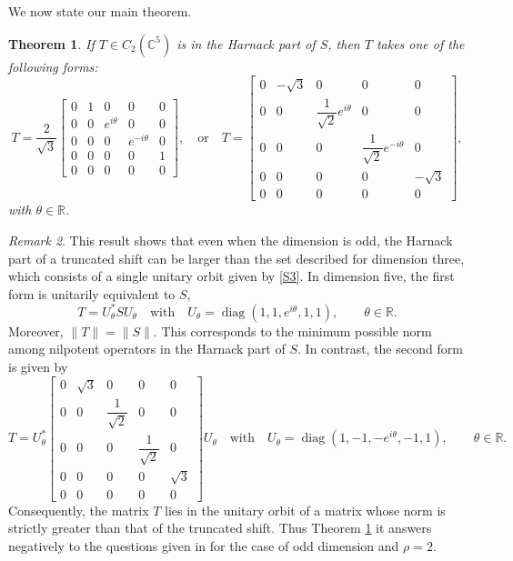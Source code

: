 \documentclass[12pt, reqno]{amsart}
\newtheorem{theorem}{Theorem}[section]
\theoremstyle{definition}
\theoremstyle{remark}
\newtheorem{remark}[theorem]{Remark}
\numberwithin{equation}{section}
\begin{document}
We now state our main theorem.

\begin{theorem}\label{Harnack_part_S5} 
	If $T\in C_2(\mathbb{C}^5)$ is in the Harnack part of $S$, then $T$ takes one of the following forms:
	\begin{equation*}
		T=\dfrac{2}{\sqrt{3}} \begin{bmatrix}
			0 & 1 & 0 & 0 & 0 \\
			0 & 0 & e^{i\theta} & 0 & 0 \\
			0 & 0 & 0 & e^{-i\theta} & 0 \\
			0 & 0 & 0 & 0 & 1 \\
			0 & 0 & 0 & 0 & 0
		\end{bmatrix},\quad \text{or} \quad 
		T=  \begin{bmatrix}
			0 & -\sqrt{3} & 0 & 0 & 0 \\
			0 & 0 & \dfrac{1}{\sqrt{2}}e^{i\theta} & 0 & 0 \\
			0 & 0 & 0 & \dfrac{1}{\sqrt{2}}e^{-i\theta} & 0 \\
			0 & 0 & 0 & 0 & -\sqrt{3} \\
			0 & 0 & 0 & 0 & 0
		\end{bmatrix},
	\end{equation*} 
	with $\theta \in \mathbb{R}$.	
\end{theorem}


\begin{remark}This result shows that even when the dimension is odd, the Harnack part of a truncated shift can be larger than the set described for dimension three, which consists of a single unitary orbit given by \eqref{S3}. In dimension five, the first form is unitarily equivalent to $S$,
	\begin{equation*}\label{S5}
		T = U_{\theta}^{*} S U_\theta \quad \text{with} \quad U_\theta = \operatorname{diag}\left(1, 1, e^{i\theta}, 1, 1 \right), \qquad \theta \in \mathbb{R}.
	\end{equation*}
	Moreover, $\|T\| = \|S\|$. This corresponds to the minimum possible norm among nilpotent operators in the Harnack part of $S$. In contrast, the second form is given by
	\begin{equation*}\label{S5c2}
		T = U_{\theta}^{*} \begin{bmatrix}
			0 & \sqrt{3} & 0 & 0 & 0 \\
			0 & 0 & \dfrac{1}{\sqrt{2}} & 0 & 0 \\
			0 & 0 & 0 & \dfrac{1}{\sqrt{2}} & 0 \\
			0 & 0 & 0 & 0 & \sqrt{3} \\
			0 & 0 & 0 & 0 & 0
		\end{bmatrix} U_\theta \quad \text{with} \quad U_\theta = \operatorname{diag}\left(1, -1, -e^{i\theta}, -1, 1 \right), \qquad \theta \in \mathbb{R}.
	\end{equation*}
	Consequently, the matrix $T$ lies in the unitary orbit of a matrix whose norm is strictly greater than that of the truncated shift. Thus Theorem  \ref{Harnack_part_S5} it answers negatively to the questions given in \cite{CassierBenharrat2020} for the case of odd dimension and $\rho=2$.
\end{remark}
\end{document}
